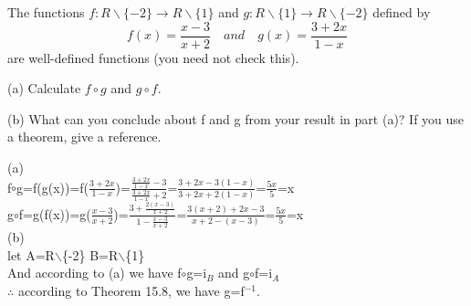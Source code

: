 \documentclass[11pt, a4paper, UTF8]{ctexart}
\begin{document}
\begin{problem}[UD:15.6]
The functions \(f:R \backslash \{-2\} \rightarrow R \backslash \{1\}\) and \(g:R \backslash \{1\} \rightarrow R \backslash \{-2\}\) defined by 
\[f(x) = \frac{x-3}{x+2} \quad and \quad g(x) = \frac{3+2x}{1-x}\]
are well-defined functions (you need not check this).

(a) Calculate \(f \circ g\) and \(g \circ f\).

(b) What can you conclude about f and g from your result in part (a)? If you use a theorem, give a reference.
\end{problem}
\begin{solution}
(a)\\
f$\circ$g=f(g(x))=f($\frac{3+2x}{1-x}$)=$\frac{\frac{3+2x}{1-x}-3}{\frac{3+2x}{1-x}+2}$=$\frac{3+2x-3(1-x)}{3+2x+2(1-x)}$=$\frac{5x}{5}$=x\\
g$\circ$f=g(f(x))=g($\frac{x-3}{x+2}$)=$\frac{3+\frac{2(x-3)}{x+2}}{1-\frac{x-3}{x+2}}$=$\frac{3(x+2)+2x-3}{x+2-(x-3)}$=$\frac{5x}{5}$=x\\
(b)\\let A=R$\backslash$\{-2\} B=R$\backslash$\{1\}\\
And according to (a) we have f$\circ$g=i$_B$ and g$\circ$f=i$_A$\\
$\therefore$ according to Theorem 15.8, we have g=f$^{-1}$.
\end{solution}
\end{document}
